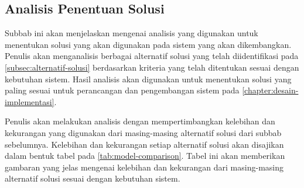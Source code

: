 \subsection{Analisis Penentuan Solusi}
\label{subsec:analisis-penentuan-solusi}

Subbab ini akan menjelaskan mengenai analisis yang digunakan untuk menentukan solusi yang akan digunakan pada sistem yang akan dikembangkan. Penulis akan menganalisis berbagai alternatif solusi yang telah diidentifikasi pada \autoref{subsec:alternatif-solusi} berdasarkan kriteria yang telah ditentukan sesuai dengan kebutuhan sistem. Hasil analisis akan digunakan untuk menentukan solusi yang paling sesuai untuk perancangan dan pengembangan sistem pada \autoref{chapter:desain-implementasi}.

Penulis akan melakukan analisis dengan mempertimbangkan kelebihan dan kekurangan yang digunakan dari masing-masing alternatif solusi dari subbab sebelumnya. Kelebihan dan kekurangan setiap alternatif solusi akan disajikan dalam bentuk tabel pada \autoref{tab:model-comparison}. Tabel ini akan memberikan gambaran yang jelas mengenai kelebihan dan kekurangan dari masing-masing alternatif solusi sesuai dengan kebutuhan sistem.

